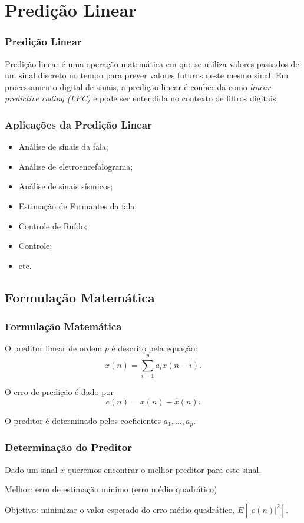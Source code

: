 \section{Predição Linear}

\begin{frame}%
  \frametitle{Predição Linear}
  Predição linear é uma operação matemática em que se utiliza valores passados de um sinal discreto no tempo para
  prever valores futuros deste mesmo sinal. Em processamento digital de sinais, a predição linear é conhecida como
  \emph{linear predictive coding (LPC)} e pode ser entendida no contexto de filtros digitais.
\end{frame}


\begin{frame}%
  \frametitle{Aplicações da Predição Linear}
  \begin{itemize}
  \item Análise de sinais da fala;
  \item Análise de eletroencefalograma;
  \item Análise de sinais sísmicos;
  \item Estimação de Formantes da fala;
  \item Controle de Ruído;
  \item Controle;
  \item etc.
  \end{itemize}
\end{frame}


\subsection{Formulação Matemática}
\begin{frame}%
  \frametitle{Formulação Matemática}
  O preditor linear de ordem $p$ é descrito pela equação:
  \begin{equation}
  \hat{x}(n) = \sum_{i=1}^{p} a_i x(n-i) .
  \end{equation}
 
  O erro de predição é dado por
  \begin{equation}
  e(n) = x(n) - \hat{x}(n) .
  \end{equation}

  O preditor é determinado pelos coeficientes $a_1, \ldots, a_p$.
\end{frame}


\begin{frame}%
  \frametitle{Determinação do Preditor}
  Dado um sinal $x$ queremos encontrar o melhor preditor para este sinal.

  Melhor: erro de estimação mínimo (erro médio quadrático)

  Objetivo: minimizar o valor esperado do erro médio quadrático, $E\left[ \vert e(n) \vert^2 \right]$.
\end{frame} 


